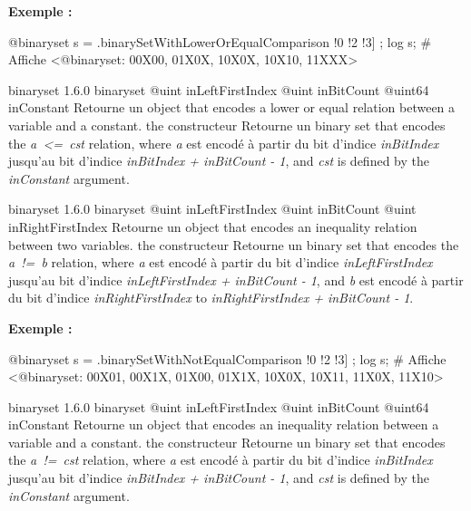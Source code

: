 \textbf{Exemple :}
\begin{galgascode}
@binaryset s = .binarySetWithLowerOrEqualComparison !0 !2 !3] ;
log s; # Affiche <@binaryset: 00X00, 01X0X, 10X0X, 10X10, 11XXX>
\end{galgascode}





{binaryset}
{1.6.0}
{binaryset}
{@uint inLeftFirstIndex}
{@uint inBitCount}
{@uint64 inConstant}
{Retourne un  object that encodes a lower or equal relation between a variable and a constant.}
{the constructeur Retourne un binary set that encodes the \emph{a~<=~cst} relation, where \emph {a} est encodé à partir du bit d'indice \emph{inBitIndex} jusqu'au bit d'indice \emph{inBitIndex  + inBitCount - 1}, and \emph{cst} is defined by the \emph{inConstant} argument.}





{binaryset}
{1.6.0}
{binaryset}
{@uint inLeftFirstIndex}
{@uint inBitCount}
{@uint inRightFirstIndex}
{Retourne un  object that encodes an inequality relation between two variables.}
{the constructeur Retourne un binary set that encodes the \emph{a~!=~b} relation, where \emph{a} est encodé à partir du bit d'indice \emph{inLeftFirstIndex} jusqu'au bit d'indice \emph{inLeftFirstIndex  + inBitCount - 1}, and \emph{b} est encodé à partir du bit d'indice \emph{inRightFirstIndex} to \emph{inRightFirstIndex + inBitCount - 1}.}

\textbf{Exemple :}
\begin{galgascode}
@binaryset s = .binarySetWithNotEqualComparison !0 !2 !3] ;
log s; # Affiche <@binaryset: 00X01, 00X1X, 01X00, 01X1X, 10X0X, 10X11, 11X0X, 11X10>
\end{galgascode}





{binaryset}
{1.6.0}
{binaryset}
{@uint inLeftFirstIndex}
{@uint inBitCount}
{@uint64 inConstant}
{Retourne un  object that encodes an inequality relation between a variable and a constant.}
{the constructeur Retourne un binary set that encodes the \emph{a~!=~cst} relation, where \emph {a} est encodé à partir du bit d'indice \emph{inBitIndex} jusqu'au bit d'indice \emph{inBitIndex  + inBitCount - 1}, and \emph{cst} is defined by the \emph{inConstant} argument.}








